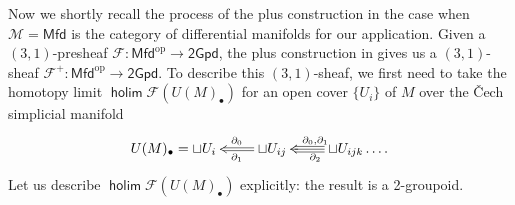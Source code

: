 \documentclass[letterpaper,10pt, oneside]{article} %
\newcommand{\Cat}{\mathcal M}%
\newcommand{\Mfd}{\mathsf{Mfd}}%
\newcommand{\tGpd}{\mathsf{2Gpd}}%
\DeclareMathOperator{\holim}{\mathsf{holim}}
\newcommand{\op}{\mathrm{op}}%
\newcommand{\huaF}{\mathcal{F}}
\begin{document}
Now we shortly recall the process of the plus construction in the case when $\Cat=\Mfd$ is
the category of differential manifolds for our application. Given a $(3, 1)$-presheaf $\huaF: \Mfd^\op \to \tGpd$, the plus construction in \cite{nikolaus-schweigert}
gives us a $(3,1)$-sheaf
$\huaF^+: \Mfd^\op \to \tGpd$. To describe this $(3, 1)$-sheaf, we first need to take
the homotopy limit $\holim
\huaF(U(M)_\bullet)$ for an open cover $\{U_i\}$ of $M$ over the \v{C}ech
simplicial manifold
\begin{equation}\label{defi:UM}
\xymatrix{U(M)_\bullet=  \sqcup U_i  &
  \ar@2[l]^{\qquad\partial_1}_{\qquad\partial_0} \sqcup U_{ij} & \sqcup
              U_{ijk} \ar@3[l]_{\partial_0, \partial_1}^{\partial_2} \dots .}
  \end{equation}
Let us describe  $\holim
\huaF(U(M)_\bullet)$ explicitly: the result is a
2-groupoid.
\end{document}
